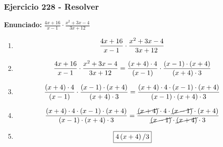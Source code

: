 \documentclass[11pt,a4paper]{article}
\newcommand{\fitmath}[1]{%
\[
\setbox0=\hbox{$\displaystyle #1$}%
\ifdim\wd0>\linewidth
\resizebox{\linewidth}{!}{$\displaystyle #1$}%
\else
#1%
\fi
\]
}
\begin{document}
\subsubsection*{Ejercicio 228 - Resolver}
\textbf{Enunciado:} $ \frac{4 x + 16}{x - 1} \cdot \frac{x^{2} + 3 x - 4}{3 x + 12} $\par
\begin{enumerate}[leftmargin=2em]
\item \fitmath{\frac{4 x + 16}{x - 1} \cdot \frac{x^{2} + 3 x - 4}{3 x + 12}}
\item \fitmath{\frac{4 x + 16}{x - 1} \cdot \frac{x^{2} + 3 x - 4}{3 x + 12}= \frac{\left(x + 4\right)\cdot 4}{\left(x - 1\right)} \cdot \frac{\left(x - 1\right)\cdot \left(x + 4\right)}{\left(x + 4\right)\cdot 3}}
\item \fitmath{\frac{\left(x + 4\right)\cdot 4}{\left(x - 1\right)}\cdot \frac{\left(x - 1\right)\cdot \left(x + 4\right)}{\left(x + 4\right)\cdot 3}= \frac{\left(x + 4\right)\cdot 4\cdot \left(x - 1\right)\cdot \left(x + 4\right)}{\left(x - 1\right)\cdot \left(x + 4\right)\cdot 3}}
\item \fitmath{\frac{\left(x + 4\right)\cdot 4\cdot \left(x - 1\right)\cdot \left(x + 4\right)}{\left(x - 1\right)\cdot \left(x + 4\right)\cdot 3}= \frac{\cancel{\left(x + 4\right)}\cdot 4\cdot \cancel{\left(x - 1\right)}\cdot \left(x + 4\right)}{\cancel{\left(x - 1\right)}\cdot \cancel{\left(x + 4\right)}\cdot 3}}
\item \fitmath{\boxed{4 \left(x + 4\right) / 3}}
\end{enumerate}

\vspace{0.12cm}
\end{document}
